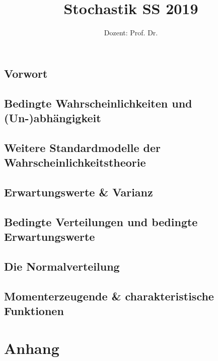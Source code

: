 \documentclass[ngerman,a4paper,order=firstname]{local_mathscript} %
\title{\textbf{Stochastik SS 2019}}
\author{Dozent: Prof. Dr. \person{Anita Behme}}
\begin{document}
\pagestyle{plain}

\maketitle

\hypertarget{tocpage}{}
\tableofcontents
{}

\pagebreak
{}
\pagestyle{fancy}

\chapter*{Vorwort}





\chapter[Bedingte Wkeiten und (Un-)abbhängigkeit]{Bedingte Wahrscheinlichkeiten und (Un-)ab\-hängigkeit}


\chapter{Weitere Standardmodelle der Wahrscheinlichkeitstheorie}


\chapter{Erwartungswerte \& Varianz}



\chapter{Bedingte Verteilungen und bedingte Erwartungswerte}


\chapter{Die Normalverteilung}

\chapter{Momenterzeugende \& charakteristische Funktionen}


\part*{Anhang}
\appendix

\nocite{*}




\printindex
\end{document}
